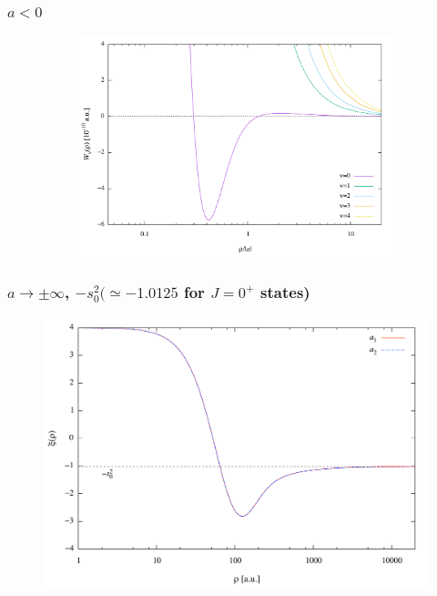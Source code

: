 \documentclass{beamer}
\begin{document}
\begin{frame}
\frametitle{$a<0$}
\begin{figure}
	\begin{figure}
		\includegraphics[width=0.8\linewidth]{Wneg.pdf}
	\end{figure}
\end{figure}
\end{frame}


\begin{frame}
\frametitle{$a \rightarrow \pm \infty$, $-s_0^2 (\simeq -1.0125$ for $J=0^+$ states)}
\begin{figure}
	\includegraphics[width=0.8\linewidth]{infty.pdf}
\end{figure}
\end{frame}
\end{document}

